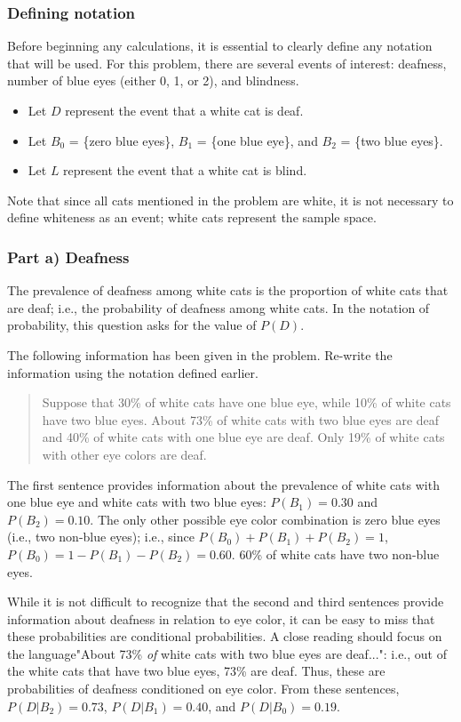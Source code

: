 \subsubsection{Defining notation}

Before beginning any calculations, it is essential to clearly define any notation that will be used. For this problem, there are several events of interest: deafness, number of blue eyes (either 0, 1, or 2), and blindness. 

\begin{itemize}
	\item Let $D$ represent the event that a white cat is deaf.
	\item Let $B_0$ = \{zero blue eyes\}, $B_1$ = \{one blue eye\}, and $B_2$ = \{two blue eyes\}.
	\item Let $L$ represent the event that a white cat is blind.
\end{itemize}

Note that since all cats mentioned in the problem are white, it is not necessary to define whiteness as an event; white cats represent the sample space.

\subsubsection{Part a) Deafness}

The prevalence of deafness among white cats is the proportion of white cats that are deaf; i.e., the probability of deafness among white cats. In the notation of probability, this question asks for the value of $P(D)$.

\begin{example}{The following information has been given in the problem. Re-write the information using the notation defined earlier.
	\begin{quote}
		Suppose that 30\% of white cats have one blue eye, while 10\% of white cats have two blue eyes. About 73\% of white cats with two blue eyes are deaf and 40\% of white cats with one blue eye are deaf. Only 19\% of white cats with other eye colors are deaf.
	\end{quote}}

The first sentence provides information about the prevalence of white cats with one blue eye and white cats with two blue eyes: $P(B_1) = 0.30$ and $P(B_2) = 0.10$. The only other possible eye color combination is zero blue eyes (i.e., two non-blue eyes); i.e., since $P(B_0) + P(B_1) + P(B_2) = 1$, $P(B_0) = 1  - P(B_1) - P(B_2) = 0.60$. 60\% of white cats have two non-blue eyes.

While it is not difficult to recognize that the second and third sentences provide information about deafness in relation to eye color, it can be easy to miss that these probabilities are conditional probabilities. A close reading should focus on the language\textemdash "About 73\% \textit{of} white cats with two blue eyes are deaf...": i.e., out of the white cats that have two blue eyes, 73\% are deaf. Thus, these are probabilities of deafness conditioned on eye color. From these sentences, $P(D|B_2) = 0.73$, $P(D|B_1) = 0.40$, and $P(D|B_0) = 0.19$. 

\end{example}

